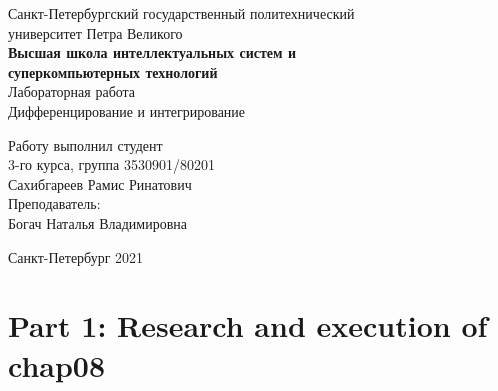 \documentclass[a4paper]{article}
\begin{document}
    \begin{center}
        \begin{center}
        \hfill \break
        \normalsize{Санкт-Петербургский государственный политехнический}\\
        \normalsize{университет Петра Великого}\\
        \hfill \break
        \normalsize{\textbf{Высшая школа интеллектуальных систем и}}\\ 
        \normalsize{\textbf{суперкомпьютерных технологий}}\\ 
        \hfill \break
        \hfill \break
        \hfill \break
        \normalsize{Лабораторная работа}\\
        \hfill \break
        \hfill \break
        \normalsize{\LARGE Дифференцирование и интегрирование}\\
        \end{center}
        \hfill \break
        \hfill \break
        \hfill \break
        \hfill \break
        \hfill \break
        \hfill \break
        \hfill \break
        \hfill \break
        \hfill \break
        \hfill \break
        \begin{flushright}
            \normalsize{Работу выполнил студент}\\
            \normalsize{3-го курса, группа 3530901/80201}\\
            \normalsize{Сахибгареев Рамис Ринатович}\\
            \hfill \break
            \normalsize{Преподаватель:}\\
            \normalsize{Богач Наталья Владимировна}\\
        \end{flushright}
        \hfill \break
        \hfill \break
        \hfill \break
        \hfill \break
        \begin{center} Санкт-Петербург 2021 \end{center}
        \thispagestyle{empty}
    \end{center}
    
    \newpage
        \tableofcontents
    
    \newpage
         \listoffigures
    
    \newpage
         \lstlistoflistings   
     
    \newpage
        \section{Part 1: Research and execution of chap08}
        
\end{document}

